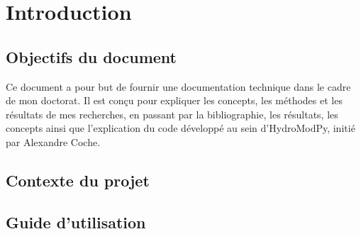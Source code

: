 
\chapter{Introduction}
\label{chap:introduction}

\minitableofcontents

\newpage


\section{Objectifs du document}
\label{sec:objectifs_du_document}

Ce document a pour but de fournir une documentation technique dans le cadre de mon doctorat. Il est conçu pour expliquer les concepts, les méthodes et les résultats de mes recherches, en passant par la bibliographie, les résultats, les concepts ainsi que l'explication du code développé au sein d'HydroModPy, initié par Alexandre Coche.

\section{Contexte du projet}
\label{sec:contexte_du_projet}

\section{Guide d'utilisation}
\label{sec:guide_d_utilisation}

